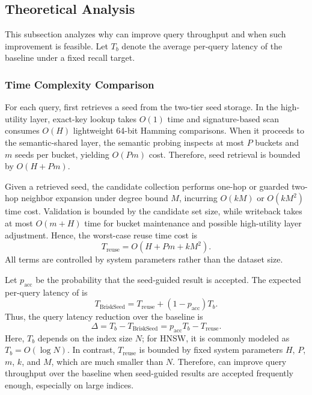 \subsection{Theoretical Analysis}
\label{subsec:briskseed-complexity}

This subsection analyzes why \system can improve query throughput and when such improvement is feasible. Let $T_b$ denote the average per-query latency of the baseline under a fixed recall target.

\subsubsection{Time Complexity Comparison}
For each query, \system first retrieves a seed from the two-tier seed storage. In the high-utility layer, exact-key lookup takes $O(1)$ time and signature-based scan consumes $O(H)$ lightweight 64-bit Hamming comparisons. When it proceeds to the semantic-shared layer, the semantic probing inspects at most $P$ buckets and $m$ seeds per bucket, yielding $O(Pm)$ cost. Therefore, seed retrieval is bounded by $O(H+Pm)$.

Given a retrieved seed, the candidate collection performs one-hop or guarded two-hop neighbor expansion under degree bound $M$, incurring $O(kM)$ or $O(kM^2)$ time cost. Validation is bounded by the candidate set size, while writeback takes at most $O(m+H)$ time for bucket maintenance and possible high-utility layer adjustment. Hence, the worst-case reuse time cost is
\begin{equation}
T_{\text{reuse}} = O(H+Pm + kM^2).
\end{equation}
All terms are controlled by system parameters rather than the dataset size.


Let $p_{\text{acc}}$ be the probability that the seed-guided result is accepted.
The expected per-query latency of \system is
\begin{equation}
T_{\text{BriskSeed}} = T_{\text{reuse}} + (1-p_{\text{acc}})T_b.
\end{equation}
Thus, the query latency reduction over the baseline is
\begin{equation}
\Delta = T_b - T_{\text{BriskSeed}} = p_{\text{acc}}T_b - T_{\text{reuse}}.
\end{equation}
Here, $T_b$ depends on the index size $N$; for HNSW, it is commonly modeled as $T_b=O(\log N)$. In contrast, $T_{\text{reuse}}$ is bounded by fixed system parameters $H$, $P$, $m$, $k$, and $M$, which are much smaller than $N$. Therefore, \system can improve query throughput over the baseline when seed-guided results are accepted frequently enough, especially on large indices.





